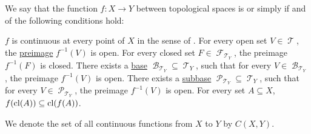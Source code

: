 \begin{definition}\label{def:global_continuity}
  We say that the function \( f: X \to Y \) between topological spaces is  or simply  if and of the following conditions hold:
  \begin{thmenum}
     \( f \) is continuous at every point of \( X \) in the sense of .
     For every open set \( V \in \mscrT \), the \hyperref[def:function/preimage]{preimage} \( f^{-1}(V) \) is open.
     For every closed set \( F \in \mscrF_{\mscrT_Y} \), the preimage \( f^{-1}(F) \) is closed.
     There exists a \hyperref[def:topological_base]{base} \( \mscrB_{\mscrT_Y} \subseteq \mscrT_Y \), such that for every \( V \in \mscrB_{\mscrT_Y} \), the preimage \( f^{-1}(V) \) is open.
     There exists a \hyperref[def:topological_subbase]{subbase} \( \mscrP_{\mscrT_Y} \subseteq \mscrT_Y \), such that for every \( V \in \mscrP_{\mscrT_Y} \), the preimage \( f^{-1}(V) \) is open.
     For every set \( A \subseteq X \), \( f(\operatorname{cl}(A)) \subseteq \operatorname{cl}(f(A)) \).
  \end{thmenum}

  We denote the set of all continuous functions from \( X \) to \( Y \) by \( C(X, Y) \).
\end{definition}
